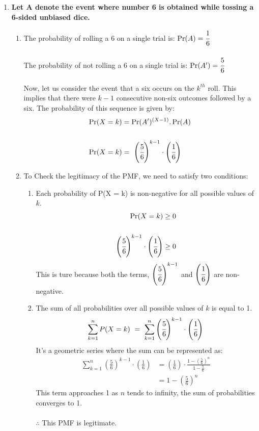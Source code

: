 \documentclass{article}
\begin{document}
\begin{enumerate}
\newpage
\item \textbf{Let A denote the event where number 6 is obtained while tossing a 6-sided unbiased dice.}\\
  \begin{enumerate}
    \item \textnormal{The probability of rolling a 6 on a single trial is: \(\Pr(A) = \cfrac{1}{6}\)}\\\\
    \textnormal{The probability of not rolling a 6 on a single trial is: \(\Pr(A') = \cfrac{5}{6}\)}\\\\
    Now, let us consider the event that a six occurs on the \(k^{th}\) roll. This implies that there were \(k-1\) consecutive non-six outcomes followed by a six. The probability of this sequence is given by:
    \begin{align*}
      \Pr(X= k) & = \Pr(A')^{(X-1)}.\Pr(A)\\\\
      \Pr(X= k)& =\ \left(\cfrac{5}{6}\right)^{k-1}\cdot \left(\cfrac{1}{6}\right)\\
    \end{align*}
    \item To Check the legitimacy of the PMF, we need to satisfy two conditions:
      \begin{enumerate}
        \item Each probability of P(X = k) is non-negative for all possible values of \(k\).
        \begin{align*}
          \Pr(X=k) \geq 0\\\\
          \left(\cfrac{5}{6}\right)^{k-1}\cdot \left(\cfrac{1}{6}\right) \geq 0
        \end{align*}
        This is ture because both the terms, \(\left(\cfrac{5}{6}\right)^{k-1}\) and \(\left(\cfrac{1}{6}\right)\) are non-negative.\\
        \item The sum of all probabilities over all possible values of \(k\) is equal to 1.
        \begin{align*}
          \sum_{k=1}^{n} P(X=k)\ =\ \sum_{k=1}^{n} \left(\cfrac{5}{6}\right)^{k-1}\cdot \left(\cfrac{1}{6}\right)
        \end{align*}
        It's a geometric series where the sum can be represented as:\\
        \begin{align*}
          \sum_{k=1}^{n} \left(\frac{5}{6}\right)^{k-1} \cdot \left(\frac{1}{6}\right) &= \left(\frac{1}{6}\right) \cdot \frac{1 - \left(\frac{5}{6}\right)^n}{1 - \frac{5}{6}} \\
          &= 1 - \left(\frac{5}{6}\right)^n
      \end{align*}
      This term approaches 1 as \(n\) tends to infinity, the sum of probabilities converges to 1.\\\\
      $\therefore$ This PMF is legitimate.
      \end{enumerate}
  \end{enumerate}


\end{enumerate}
\end{document}

